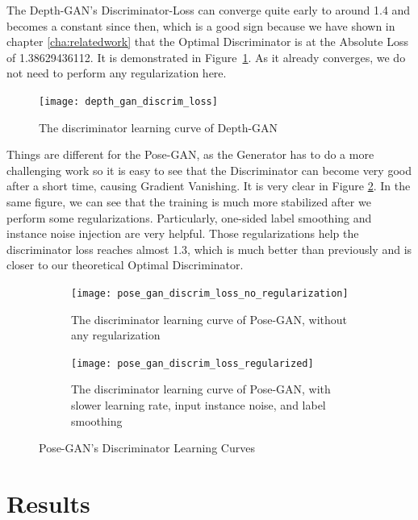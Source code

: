 The Depth-GAN's Discriminator-Loss can converge quite early to around 1.4 and becomes a
constant since then, which is a good sign because we have shown in chapter
\ref{cha:relatedwork} that the Optimal Discriminator is at the Absolute Loss of
1.38629436112. It is demonstrated in Figure~\ref{fig:depth_gan_discrim_loss}. As it
already converges, we do not need to perform any regularization here.

\begin{figure}[h!]
	\centering
	\texttt{[image: depth\_gan\_discrim\_loss]}
	\caption{The discriminator learning curve of Depth-GAN}
	\label{fig:depth_gan_discrim_loss}
\end{figure}

Things are different for the Pose-GAN, as the Generator has to do a more challenging work
so it is easy to see that the Discriminator can become very good after a short time,
causing Gradient Vanishing. It is very clear in Figure \ref{fig:pose_gan_discrim_loss}. In
the same figure, we can see that the training is much more stabilized after we perform
some regularizations. Particularly, one-sided label smoothing and instance noise injection
are very helpful. Those regularizations help the discriminator loss reaches almost 1.3,
which is much better than previously and is closer to our theoretical Optimal
Discriminator.

\begin{figure}[h!]
	\centering
	
	\begin{subfigure}{\textwidth}
		\begin{center}
			\texttt{[image: pose\_gan\_discrim\_loss\_no\_regularization]}
		\end{center}
		\caption{The discriminator learning curve of Pose-GAN, without any regularization}
	\end{subfigure}

	\begin{subfigure}{\textwidth}
		\begin{center}
			\texttt{[image: pose\_gan\_discrim\_loss\_regularized]}
		\end{center}
		\caption{The discriminator learning curve of Pose-GAN, with slower learning rate,
		input instance noise, and label smoothing}
	\end{subfigure}
	\caption{Pose-GAN's Discriminator Learning Curves}
	\label{fig:pose_gan_discrim_loss}
\end{figure}

\section{Results}
\label{sec:results}

